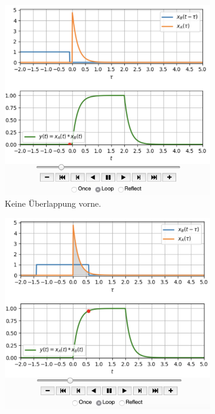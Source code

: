 \begin{figure}[h!]
\centering
\begin{subfigure}{0.45\textwidth}
\centering
\includegraphics[width=\textwidth]{../convolution_ct/conv_var2_1_C964DD7400.png}
\caption{Keine Überlappung vorne.}
\label{fig:C964DD7400_v2_1}
\end{subfigure}
\begin{subfigure}{0.45\textwidth}
\centering
\includegraphics[width=\textwidth]{../convolution_ct/conv_var2_2_C964DD7400.png}

\end{subfigure}
\end{figure}
